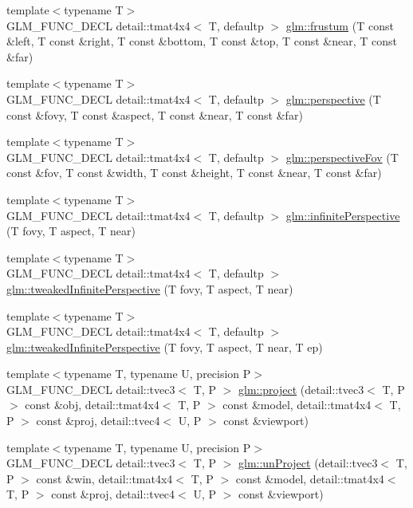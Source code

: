 \begin{CompactItemize}
{\footnotesize template$<$typename T$>$ }\\GLM\_\-FUNC\_\-DECL detail::tmat4x4$<$ T, defaultp $>$ \hyperlink{group__gtc__matrix__transform_g0ef39da6d6c83806dea5ff455eb225cf}{glm::frustum} (T const \&left, T const \&right, T const \&bottom, T const \&top, T const \&near, T const \&far)
\item 
{\footnotesize template$<$typename T$>$ }\\GLM\_\-FUNC\_\-DECL detail::tmat4x4$<$ T, defaultp $>$ \hyperlink{group__gtc__matrix__transform_g6f705d60660ad2d4ef540ca0bb59273e}{glm::perspective} (T const \&fovy, T const \&aspect, T const \&near, T const \&far)
\item 
{\footnotesize template$<$typename T$>$ }\\GLM\_\-FUNC\_\-DECL detail::tmat4x4$<$ T, defaultp $>$ \hyperlink{group__gtc__matrix__transform_gc9db4ea8ecdcb00f1d06d29603b5df52}{glm::perspectiveFov} (T const \&fov, T const \&width, T const \&height, T const \&near, T const \&far)
\item 
{\footnotesize template$<$typename T$>$ }\\GLM\_\-FUNC\_\-DECL detail::tmat4x4$<$ T, defaultp $>$ \hyperlink{group__gtc__matrix__transform_g2b5303a99580dc5a2ffe4cd9303397a9}{glm::infinitePerspective} (T fovy, T aspect, T near)
\item 
{\footnotesize template$<$typename T$>$ }\\GLM\_\-FUNC\_\-DECL detail::tmat4x4$<$ T, defaultp $>$ \hyperlink{group__gtc__matrix__transform_ge918d92c6d1fc5c0f97ac96d66e90b6a}{glm::tweakedInfinitePerspective} (T fovy, T aspect, T near)
\item 
{\footnotesize template$<$typename T$>$ }\\GLM\_\-FUNC\_\-DECL detail::tmat4x4$<$ T, defaultp $>$ \hyperlink{group__gtc__matrix__transform_gb4748de5e549cbd83682c9d28a9ccdac}{glm::tweakedInfinitePerspective} (T fovy, T aspect, T near, T ep)
\item 
{\footnotesize template$<$typename T, typename U, precision P$>$ }\\GLM\_\-FUNC\_\-DECL detail::tvec3$<$ T, P $>$ \hyperlink{group__gtc__matrix__transform_ge6de64f8b0a55befb0e296475c6f0c79}{glm::project} (detail::tvec3$<$ T, P $>$ const \&obj, detail::tmat4x4$<$ T, P $>$ const \&model, detail::tmat4x4$<$ T, P $>$ const \&proj, detail::tvec4$<$ U, P $>$ const \&viewport)
\item 
{\footnotesize template$<$typename T, typename U, precision P$>$ }\\GLM\_\-FUNC\_\-DECL detail::tvec3$<$ T, P $>$ \hyperlink{group__gtc__matrix__transform_g90b6f19047316d870f88e0a50d8b13f3}{glm::unProject} (detail::tvec3$<$ T, P $>$ const \&win, detail::tmat4x4$<$ T, P $>$ const \&model, detail::tmat4x4$<$ T, P $>$ const \&proj, detail::tvec4$<$ U, P $>$ const \&viewport)

\end{CompactItemize}
